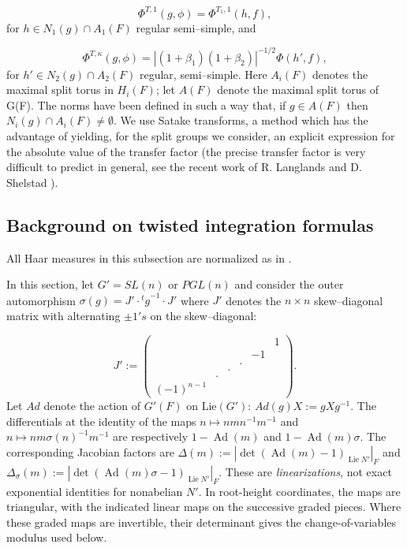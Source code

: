 \documentclass[12pt,letterpaper]{amsart}
\numberwithin{equation}{section}
\theoremstyle{definition}
\theoremstyle{plain}
\begin{document}
\begin{equation}
\label{eqn:2.1}
\Phi^{T,1}(g,\phi ) = \Phi^{T_1,1}(h,f),
\end{equation}
for $h\in N_1(g)\cap A_1(F)$ regular semi--simple, and

\begin{equation}
\label{eqn:2.2}
\Phi^{T,\kappa}(g,\phi ) = |(1+\beta_1)(1+\beta_2)|^{-1/2}\Phi(h',f),
\end{equation}
for $h'\in N_2(g)\cap A_2(F)$ regular, semi--simple. Here $A_i(F)$ denotes
the maximal split torus in $H_i(F)$; let $A(F)$ denote the maximal split torus
of G(F). The norms have been defined in such a way that, if $g\in A(F)$
then $N_i(g)\cap A_i(F) \not= \emptyset$. We use Satake transforms,
a method which has the advantage of yielding, for the split groups
we consider, an explicit expression for the absolute value of the
transfer factor (the precise transfer factor is very difficult to predict in
general, see the recent work of R. Langlands and D. Shelstad \cite{LS87}).

\subsection{Background on twisted integration formulas}
\label{sec:2.2}

All Haar measures in this subsection are normalized as in \cite{Ca79}.
\par
In this section, let $G' =SL(n)$ or $PGL(n)$ 
and consider the outer automorphism
$\sigma (g) = J'\cdot {^{t}g}^{-1}\cdot J'$ where $J'$ denotes the $n\times n$
skew--diagonal matrix with alternating $\pm 1's$ on the skew--diagonal:

\[
J':=
\left(
\begin{array}{cccccc}
 \ &\ &\ &\ &\ &1\\
\ &\ &\ &\ &-1&\ \\
\ &\ &\ &.&\ &\ \\
\ &\ &.&\ &\ &\ \\
\ &.&\ &\ &\ &\ \\
(-1)^{n-1}&\ &\ &\ &\ &\
\end{array}
\right) .
\]
Let $Ad$ denote the action of $G'(F)$ on Lie$(G')$:
$Ad(g)X :=gXg^{-1}$. 
The differentials at the identity of the maps
$n\mapsto nmn^{-1}m^{-1}$ and $n\mapsto
nm\sigma(n)^{-1}m^{-1}$ are respectively
$1-\operatorname{Ad}(m)$ and $1-\operatorname{Ad}(m)\sigma$.
The corresponding Jacobian factors are
$\Delta(m):=|\det(\operatorname{Ad}(m)-1)_{\operatorname{Lie}N'}|_F$
and $\Delta_\sigma(m):=
|\det(\operatorname{Ad}(m)\sigma-1)_{\operatorname{Lie}N'}|_F$.
These are \emph{linearizations}, not exact exponential identities for
nonabelian $N'$. In root-height coordinates, the maps are triangular,
with the indicated linear maps on the successive graded pieces. Where
these graded maps are invertible, their determinant gives the
change-of-variables modulus used below.
 
\end{document}
